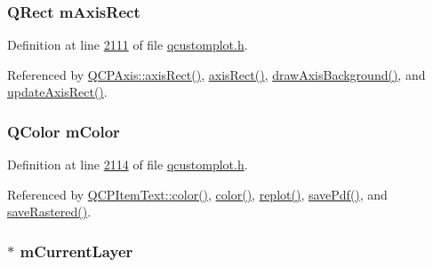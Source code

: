 \hypertarget{a00116_aad382d311cfe6a81f47aa4ae3350021b}{
\subsubsection[{m\+Axis\+Rect}]{\setlength{\rightskip}{0pt plus 5cm}Q\+Rect m\+Axis\+Rect}}\label{a00116_aad382d311cfe6a81f47aa4ae3350021b}


Definition at line \hyperlink{a00116_source_l02111}{2111} of file \hyperlink{a00116_source}{qcustomplot.\+h}.



Referenced by \hyperlink{a00116_source_l01702}{Q\+C\+P\+Axis\+::axis\+Rect()}, \hyperlink{a00116_source_l01956}{axis\+Rect()}, \hyperlink{a00115_source_l08090}{draw\+Axis\+Background()}, and \hyperlink{a00115_source_l08116}{update\+Axis\+Rect()}.

\hypertarget{a00116_ac071280171e215ffc7d416118bc28d90}{
\subsubsection[{m\+Color}]{\setlength{\rightskip}{0pt plus 5cm}Q\+Color m\+Color}}\label{a00116_ac071280171e215ffc7d416118bc28d90}


Definition at line \hyperlink{a00116_source_l02114}{2114} of file \hyperlink{a00116_source}{qcustomplot.\+h}.



Referenced by \hyperlink{a00116_source_l01117}{Q\+C\+P\+Item\+Text\+::color()}, \hyperlink{a00116_source_l01963}{color()}, \hyperlink{a00115_source_l07221}{replot()}, \hyperlink{a00115_source_l07350}{save\+Pdf()}, and \hyperlink{a00115_source_l08146}{save\+Rastered()}.

\hypertarget{a00116_ae9821179b860bf04af25882e881e5e09}{
\subsubsection[{m\+Current\+Layer}]{$\ast$ m\+Current\+Layer}}\label{a00116_ae9821179b860bf04af25882e881e5e09}


